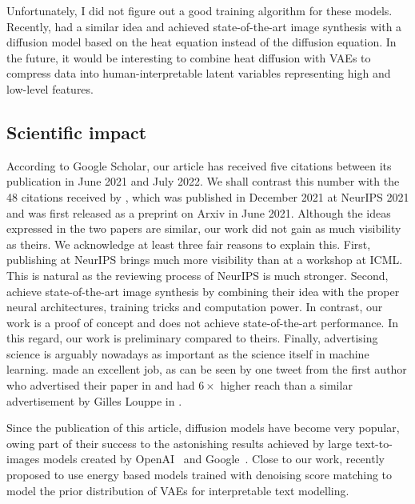 Unfortunately, I did not figure out a good training algorithm for these models. Recently, \citet{rissanen2022generative} had a similar idea and achieved state-of-the-art image synthesis with a diffusion model based on the heat equation instead of the diffusion equation. In the future, it would be interesting to combine heat diffusion with VAEs to compress data into human-interpretable latent variables representing high and low-level features.

\subsection{Scientific impact}

According to Google Scholar, our article has received five citations between its publication in June 2021 and July 2022. We shall contrast this number with the 48 citations received by \citet{vahdat2021score}, which was published in December 2021 at NeurIPS 2021 and was first released as a preprint on Arxiv in June 2021. Although the ideas expressed in the two papers are similar, our work did not gain as much visibility as theirs. We acknowledge at least three fair reasons to explain this. First, publishing at NeurIPS brings much more visibility than at a workshop at ICML. This is natural as the reviewing process of NeurIPS is much stronger. Second, \citet{vahdat2021score} achieve state-of-the-art image synthesis by combining their idea with the proper neural architectures, training tricks and computation power.
In contrast, our work is a proof of concept and does not achieve state-of-the-art performance. In this regard, our work is preliminary compared to theirs. Finally, advertising science is arguably nowadays as important as the science itself in machine learning.\citet{vahdat2021score} made an excellent job, as can be seen by one tweet from the first author who advertised their paper in  and had $6\times$ higher reach than a similar advertisement by Gilles Louppe in .

Since the publication of this article, diffusion models have become very popular, owing part of their success to the astonishing results achieved by large text-to-images models created by OpenAI~\citep[$\text{DALL}\cdot\text{E} 2$][]{ramesh2022hierarchical} and Google~\citep[Imagen][]{saharia2022photorealistic}. Close to our work, \citet{yu2022latent} recently proposed to use energy based models trained with denoising score matching to model the prior distribution of VAEs for interpretable text modelling.



